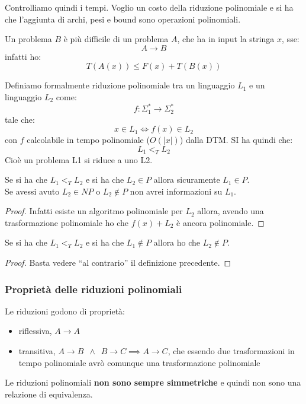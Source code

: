 Controlliamo quindi i tempi. Voglio un costo della riduzione polinomiale e si ha
che l'aggiunta di archi, pesi e bound sono operazioni polinomiali.
\begin{definizione}
  Un problema $B$ è più difficile di un problema $A$, che ha in input la stringa
  $x$, sse:
  \[A\to B\]
  infatti ho:
  \[T(A(x))\leq F(x)+T(B(x))\]
\end{definizione}
\begin{definizione}
  Definiamo formalmente riduzione polinomiale tra un linguaggio $L_1$ e un
  linguaggio $L_2$ come:
  \[f:\Sigma_1^*\to \Sigma_2^*\]
  tale che:
  \[x\in L_1\iff f(x)\in L_2\]
  con $f$ calcolabile in tempo polinomiale ($O(|x|)$) dalla DTM. SI ha quindi
  che:
  \[L_1<_T L_2\]
  Cioè un problema L1 si riduce a uno L2.
\end{definizione}
\begin{definizione}
  Se si ha che $L_1<_T L_2$ e si ha che $L_2\in P$ allora sicuramente $L_1\in
  P$.\\
  Se avessi avuto $L_2\in NP$ o $L_2\not\in P$ non avrei informazioni su $L_1$. 

\end{definizione}
\begin{proof}
  Infatti esiste un algoritmo polinomiale per $L_2$ allora, avendo una
  trasformazione polinomiale  ho che $f(x)+L_2$ è ancora polinomiale.
\end{proof}
\begin{definizione}
  Se si ha che $L_1<_T L_2$ e si ha che $L_1\not\in P$ allora ho che
  $L_2\not\in P$.
\end{definizione}
\begin{proof}
  Basta vedere ``al contrario'' il definizione precedente.
\end{proof}
\subsubsection{Proprietà delle riduzioni polinomiali}
Le riduzioni godono di proprietà:
\begin{itemize}
  \item riflessiva, $A\to A$
  \item transitiva, $A\to B\,\,\,\land \,\,\,B\to C\implies A\to C$, che essendo
  due trasformazioni in tempo polinomiale avrò comunque una trasformazione
  polinomiale 
\end{itemize}
Le riduzioni polinomiali \textbf{non sono sempre simmetriche} e quindi non sono
una relazione di equivalenza.\\
